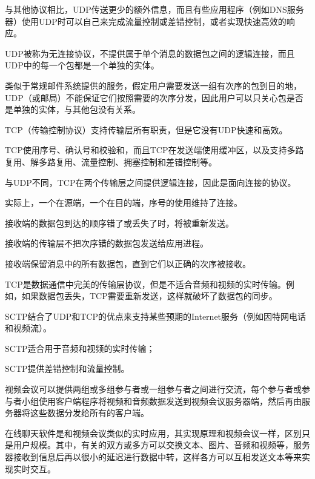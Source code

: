 与其他协议相比，UDP传送更少的额外信息，而且有些应用程序（例如DNS服务器）使用UDP时可以自己来完成流量控制或差错控制，或者实现快速高效的响应。

UDP被称为无连接协议，不提供属于单个消息的数据包之间的逻辑连接，而且UDP中的每一个包都是一个单独的实体。

类似于常规邮件系统提供的服务，假定用户需要发送一组有次序的包到目的地，UDP（或邮局）不能保证它们按照需要的次序分发，因此用户可以只关心包是否是单独的实体，与其他包没有关系。

TCP（传输控制协议）支持传输层所有职责，但是它没有UDP快速和高效。

TCP使用序号、确认号和校验和，而且TCP在发送端使用缓冲区，以及支持多路复用、解多路复用、流量控制、拥塞控制和差错控制等。

与UDP不同，TCP在两个传输层之间提供逻辑连接，因此是面向连接的协议。

实际上，一个在源端，一个在目的端，序号的使用维持了连接。

\begin{compactitem}
\item 接收端的数据包到达的顺序错了或丢失了时，将被重新发送。
\item 接收端的传输层不把次序错的数据包发送给应用进程。
\item 接收端保留消息中的所有数据包，直到它们以正确的次序被接收。
\end{compactitem}

TCP是数据通信中完美的传输层协议，但是不适合音频和视频的实时传输。例如，如果数据包丢失，TCP需要重新发送，这样就破坏了数据包的同步。

SCTP结合了UDP和TCP的优点来支持某些预期的Internet服务（例如因特网电话和视频流）。

\begin{compactitem}
\item SCTP适合用于音频和视频的实时传输；
\item SCTP提供差错控制和流量控制。
\end{compactitem}



视频会议可以提供两组或多组参与者或一组参与者之间进行交流，每个参与者或参与者小组使用客户端程序将视频和音频数据发送到视频会议服务器端，然后再由服务器将这些数据分发给所有的客户端。

在线聊天软件是和视频会议类似的实时应用，其实现原理和视频会议一样，区别只是用户规模。其中，有关的双方或多方可以交换文本、图片、音频和视频等，服务器接收到信息后再以很小的延迟进行数据中转，这样各方可以互相发送文本等来实现实时交互。





